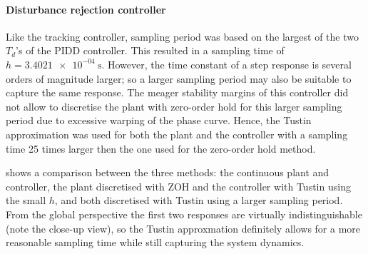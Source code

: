 \paragraph{Disturbance rejection controller}
Like the tracking controller, sampling period was based on the largest of the two $T_d$'s of the PIDD controller. This resulted in a sampling time of $h = \SI{3.4021e-04}{\second}$. However, the time constant of a step response is several orders of magnitude larger; so a larger sampling period may also be suitable to capture the same response. The meager stability margins of this controller did not allow to discretise the plant with zero-order hold for this larger sampling period due to excessive warping of the phase curve. Hence, the Tustin approximation was used for both the plant and the controller with a sampling time 25 times larger then the one used for the zero-order hold method. 

 shows a comparison between the three methods: the continuous plant and controller, the plant discretised with ZOH and the controller with Tustin using the small $h$, and both discretised with Tustin using a larger sampling period. From the global perspective the first two responses are virtually indistinguishable (note the close-up view), so the Tustin approxmation definitely allows for a more reasonable sampling time while still capturing the system dynamics.